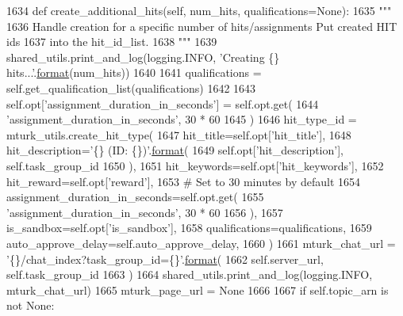 \begin{DoxyCode}
1634     \textcolor{keyword}{def }create\_additional\_hits(self, num\_hits, qualifications=None):
1635         \textcolor{stringliteral}{"""}
1636 \textcolor{stringliteral}{        Handle creation for a specific number of hits/assignments Put created HIT ids}
1637 \textcolor{stringliteral}{        into the hit\_id\_list.}
1638 \textcolor{stringliteral}{        """}
1639         shared\_utils.print\_and\_log(logging.INFO, \textcolor{stringliteral}{'Creating \{\} hits...'}.\hyperlink{namespaceparlai_1_1chat__service_1_1services_1_1messenger_1_1shared__utils_a32e2e2022b824fbaf80c747160b52a76}{format}(num\_hits))
1640 
1641         qualifications = self.get\_qualification\_list(qualifications)
1642 
1643         self.opt[\textcolor{stringliteral}{'assignment\_duration\_in\_seconds'}] = self.opt.get(
1644             \textcolor{stringliteral}{'assignment\_duration\_in\_seconds'}, 30 * 60
1645         )
1646         hit\_type\_id = mturk\_utils.create\_hit\_type(
1647             hit\_title=self.opt[\textcolor{stringliteral}{'hit\_title'}],
1648             hit\_description=\textcolor{stringliteral}{'\{\} (ID: \{\})'}.\hyperlink{namespaceparlai_1_1chat__service_1_1services_1_1messenger_1_1shared__utils_a32e2e2022b824fbaf80c747160b52a76}{format}(
1649                 self.opt[\textcolor{stringliteral}{'hit\_description'}], self.task\_group\_id
1650             ),
1651             hit\_keywords=self.opt[\textcolor{stringliteral}{'hit\_keywords'}],
1652             hit\_reward=self.opt[\textcolor{stringliteral}{'reward'}],
1653             \textcolor{comment}{# Set to 30 minutes by default}
1654             assignment\_duration\_in\_seconds=self.opt.get(
1655                 \textcolor{stringliteral}{'assignment\_duration\_in\_seconds'}, 30 * 60
1656             ),
1657             is\_sandbox=self.opt[\textcolor{stringliteral}{'is\_sandbox'}],
1658             qualifications=qualifications,
1659             auto\_approve\_delay=self.auto\_approve\_delay,
1660         )
1661         mturk\_chat\_url = \textcolor{stringliteral}{'\{\}/chat\_index?task\_group\_id=\{\}'}.\hyperlink{namespaceparlai_1_1chat__service_1_1services_1_1messenger_1_1shared__utils_a32e2e2022b824fbaf80c747160b52a76}{format}(
1662             self.server\_url, self.task\_group\_id
1663         )
1664         shared\_utils.print\_and\_log(logging.INFO, mturk\_chat\_url)
1665         mturk\_page\_url = \textcolor{keywordtype}{None}
1666 
1667         \textcolor{keywordflow}{if} self.topic\_arn \textcolor{keywordflow}{is} \textcolor{keywordflow}{not} \textcolor{keywordtype}{None}:

\end{DoxyCode}
